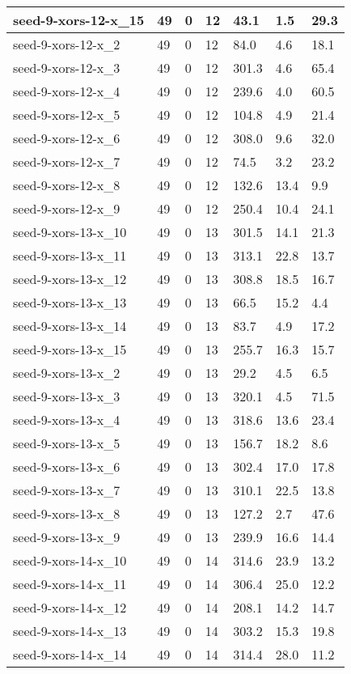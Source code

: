 \begin{scriptsize}
\begin{longtable}{|p{5cm}|l|l|l|l|l|l|}
seed-9-xors-12-x\_15&49&0&12&43.1&1.5&29.3 \\ \hline 
seed-9-xors-12-x\_2&49&0&12&84.0&4.6&18.1 \\ \hline 
seed-9-xors-12-x\_3&49&0&12&301.3&4.6&65.4 \\ \hline 
seed-9-xors-12-x\_4&49&0&12&239.6&4.0&60.5 \\ \hline 
seed-9-xors-12-x\_5&49&0&12&104.8&4.9&21.4 \\ \hline 
seed-9-xors-12-x\_6&49&0&12&308.0&9.6&32.0 \\ \hline 
seed-9-xors-12-x\_7&49&0&12&74.5&3.2&23.2 \\ \hline 
seed-9-xors-12-x\_8&49&0&12&132.6&13.4&9.9 \\ \hline 
seed-9-xors-12-x\_9&49&0&12&250.4&10.4&24.1 \\ \hline 
seed-9-xors-13-x\_10&49&0&13&301.5&14.1&21.3 \\ \hline 
seed-9-xors-13-x\_11&49&0&13&313.1&22.8&13.7 \\ \hline 
seed-9-xors-13-x\_12&49&0&13&308.8&18.5&16.7 \\ \hline 
seed-9-xors-13-x\_13&49&0&13&66.5&15.2&4.4 \\ \hline 
seed-9-xors-13-x\_14&49&0&13&83.7&4.9&17.2 \\ \hline 
seed-9-xors-13-x\_15&49&0&13&255.7&16.3&15.7 \\ \hline 
seed-9-xors-13-x\_2&49&0&13&29.2&4.5&6.5 \\ \hline 
seed-9-xors-13-x\_3&49&0&13&320.1&4.5&71.5 \\ \hline 
seed-9-xors-13-x\_4&49&0&13&318.6&13.6&23.4 \\ \hline 
seed-9-xors-13-x\_5&49&0&13&156.7&18.2&8.6 \\ \hline 
seed-9-xors-13-x\_6&49&0&13&302.4&17.0&17.8 \\ \hline 
seed-9-xors-13-x\_7&49&0&13&310.1&22.5&13.8 \\ \hline 
seed-9-xors-13-x\_8&49&0&13&127.2&2.7&47.6 \\ \hline 
seed-9-xors-13-x\_9&49&0&13&239.9&16.6&14.4 \\ \hline 
seed-9-xors-14-x\_10&49&0&14&314.6&23.9&13.2 \\ \hline 
seed-9-xors-14-x\_11&49&0&14&306.4&25.0&12.2 \\ \hline 
seed-9-xors-14-x\_12&49&0&14&208.1&14.2&14.7 \\ \hline 
seed-9-xors-14-x\_13&49&0&14&303.2&15.3&19.8 \\ \hline 
seed-9-xors-14-x\_14&49&0&14&314.4&28.0&11.2 \\ \hline 

\end{longtable}
\end{scriptsize}
